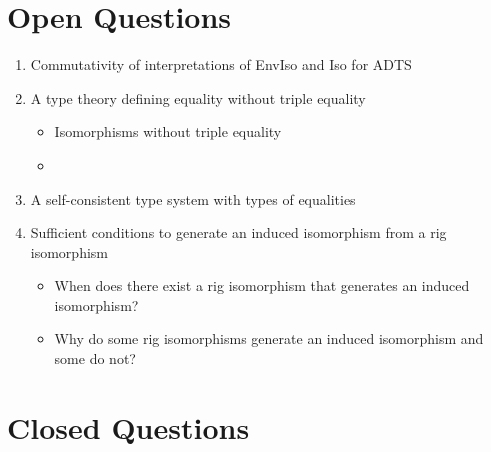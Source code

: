 \documentclass{scrartcl}
\begin{document}
\section{Open Questions}
\begin{enumerate}
  \item{Commutativity of interpretations of EnvIso and Iso for ADTS}
  \item{A type theory defining equality without triple equality}
  \begin{itemize}
    \item{Isomorphisms without triple equality}
    \item{}
  \end{itemize}
  \item{A self-consistent type system with types of equalities}
  \item{Sufficient conditions to generate an induced isomorphism from a rig isomorphism}
  \begin{itemize}
  	\item{When does there exist a rig isomorphism that generates an induced isomorphism?}
	\item{Why do some rig isomorphisms generate an induced isomorphism and some do not?}
  \end{itemize}
\end{enumerate}

\section{Closed Questions}
\end{document}
